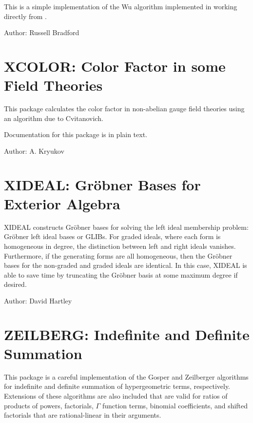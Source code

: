 This is a simple implementation of the Wu algorithm implemented in \REDUCE
working directly from \cite{Wu:1987a}.

Author: Russell Bradford



\newpage

\section{XCOLOR: Color Factor in some Field Theories}


This package calculates the color factor in non-abelian gauge field
theories using an algorithm due to Cvitanovich.

Documentation for this package is in plain text.

Author: A. Kryukov



\newpage

\section{XIDEAL: Gr\"obner Bases for Exterior Algebra}
\label{package:XIDEAL}

XIDEAL constructs Gr\"obner bases for solving the left ideal membership
problem: Gr\"obner left ideal bases or GLIBs. For graded ideals, where each
form is homogeneous in degree, the distinction between left and right
ideals vanishes. Furthermore, if the generating forms are all homogeneous,
then the Gr\"obner bases for the non-graded and graded ideals are
identical. In this case, XIDEAL is able to save time by truncating the
Gr\"obner basis at some maximum degree if desired.

Author: David Hartley



\newpage

\section{ZEILBERG: Indefinite and Definite Summation}


This package is a careful implementation of the Gosper and Zeilberger
algorithms for indefinite and definite summation of hypergeometric terms,
respectively.  Extensions of these algorithms are also included that are
valid for ratios of products of powers, factorials, $\Gamma$ function
terms, binomial coefficients, and shifted factorials that are
rational-linear in their arguments.

